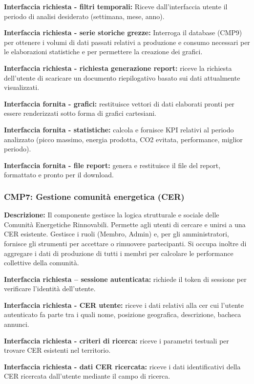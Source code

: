 \textbf{Interfaccia richiesta - filtri temporali:}
Riceve dall'interfaccia utente il periodo di analisi desiderato (settimana, mese, anno).

\textbf{Interfaccia richiesta - serie storiche grezze:}
Interroga il database (CMP9) per ottenere i volumi di dati passati relativi a produzione
e consumo necessari per le elaborazioni statistiche e per permettere la creazione dei grafici.

\textbf{Interfaccia richiesta - richiesta generazione report:}
riceve la richiesta dell'utente di scaricare un documento riepilogativo basato sui dati
attualmente visualizzati.

\textbf{Interfaccia fornita - grafici:}
restituisce vettori di dati elaborati pronti per essere renderizzati sotto forma di grafici
cartesiani.

\textbf{Interfaccia fornita - statistiche:}
calcola e fornisce KPI relativi al periodo analizzato (picco massimo, energia prodotta, CO2 evitata,
performance, miglior periodo).

\textbf{Interfaccia fornita - file report:}
genera e restituisce il file del report, formattato e pronto per il download.

\subsubsection*{CMP7: Gestione comunità energetica (CER)}
\textbf{Descrizione: } Il componente gestisce la logica strutturale e sociale delle Comunità
Energetiche Rinnovabili. Permette agli utenti di cercare e unirsi a una CER esistente. Gestisce i ruoli (Membro, Admin) e, per gli amministratori, fornisce gli
strumenti per accettare o rimuovere partecipanti. Si occupa inoltre di aggregare i dati di
produzione di tutti i membri per calcolare le performance collettive della comunità.

\textbf{Interfaccia richiesta – sessione autenticata:}
richiede il token di sessione per verificare l'identità dell'utente.

\textbf{Interfaccia richiesta - CER utente:}
riceve i dati relativi alla cer cui l'utente autenticato fa parte tra i quali nome, posizione
geografica, descrizione, bacheca annunci.

\textbf{Interfaccia richiesta - criteri di ricerca:}
riceve i parametri testuali per trovare CER esistenti nel territorio.

\textbf{Interfaccia richiesta - dati CER ricercata:}
riceve i dati identificativi della CER ricercata dall'utente mediante il campo di ricerca.


